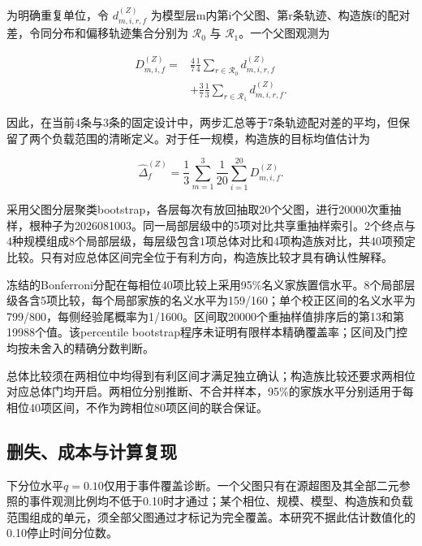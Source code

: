\documentclass[UTF8,a4paper,twocolumn,fontset=none,zihao=5]{ctexart}
\begin{document}
为明确重复单位，令 $d_{m,i,r,f}^{(Z)}$ 为模型层m内第i个父图、第r条轨迹、构造族f的配对差，令同分布和偏移轨迹集合分别为 $\mathcal R_0$ 与 $\mathcal R_1$。一个父图观测为



\begin{equation}
\begin{aligned}D_{m,i,f}^{(Z)}={}&\frac{4}{7}\frac{1}{4}\sum_{r\in\mathcal R_0}d_{m,i,r,f}^{(Z)}\\&+\frac{3}{7}\frac{1}{3}\sum_{r\in\mathcal R_1}d_{m,i,r,f}^{(Z)}.\end{aligned}
\label{eq:15}\end{equation}


因此，在当前4条与3条的固定设计中，两步汇总等于7条轨迹配对差的平均，但保留了两个负载范围的清晰定义。对于任一规模，构造族的目标均值估计为



\begin{equation}
\widehat\Delta_f^{(Z)}=\frac{1}{3}\sum_{m=1}^{3}\frac{1}{20}\sum_{i=1}^{20}D_{m,i,f}^{(Z)}.
\label{eq:16}\end{equation}


采用父图分层聚类bootstrap，各层每次有放回抽取20个父图，进行20000次重抽样，根种子为2026081003。同一局部层级中的5项对比共享重抽样索引。2个终点与4种规模组成8个局部层级，每层级包含1项总体对比和4项构造族对比，共40项预定比较。只有对应总体区间完全位于有利方向，构造族比较才具有确认性解释。


冻结的Bonferroni分配在每相位40项比较上采用95\%名义家族置信水平。8个局部层级各含5项比较，每个局部家族的名义水平为159/160；单个校正区间的名义水平为799/800，每侧经验尾概率为1/1600。区间取20000个重抽样值排序后的第13和第19988个值。该percentile bootstrap程序未证明有限样本精确覆盖率；区间及门控均按未舍入的精确分数判断。


总体比较须在两相位中均得到有利区间才满足独立确认；构造族比较还要求两相位对应总体门均开启。两相位分别推断、不合并样本，95\%的家族水平分别适用于每相位40项区间，不作为跨相位80项区间的联合保证。


\subsection{删失、成本与计算复现}

下分位水平$q=0.10$仅用于事件覆盖诊断。一个父图只有在源超图及其全部二元参照的事件观测比例均不低于0.10时才通过；某个相位、规模、模型、构造族和负载范围组成的单元，须全部父图通过才标记为完全覆盖。本研究不据此估计数值化的0.10停止时间分位数。
\end{document}
